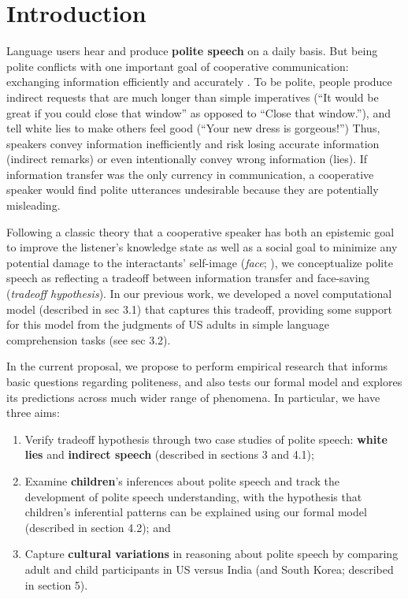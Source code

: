 \section{Introduction}\label{sec:intro}

Language users hear and produce {\bf polite speech} on a daily basis. But being polite conflicts with one important goal of cooperative communication: exchanging information efficiently and accurately \citep{Grice1975}. To be polite, people produce indirect requests that are much longer than simple imperatives (``It would be great if you could close that window'' as opposed to ``Close that window.''), and tell white lies to make others feel good (``Your new dress is gorgeous!'') Thus, speakers convey information inefficiently and risk losing accurate information (indirect remarks) or even intentionally convey wrong information (lies). If information transfer was the only currency in communication, a cooperative speaker would find polite utterances undesirable because they are potentially misleading. 

Following a classic theory that a cooperative speaker has both an epistemic goal to improve the listener's knowledge state as well as a social goal to minimize any potential damage to the interactants' self-image (\emph{face}; \citealt{Brown1987}), we conceptualize polite speech as reflecting a tradeoff between information transfer and face-saving (\emph{tradeoff hypothesis}). In our previous work, we developed a novel computational model (described in sec 3.1) that captures this tradeoff, providing some support for this model from the judgments of US adults in simple language comprehension tasks (see sec 3.2).

In the current proposal, we propose to perform empirical research that informs basic questions regarding politeness, and also tests our formal model and explores its predictions across much wider range of phenomena. In particular, we have three aims:

\begin{enumerate}

\item Verify tradeoff hypothesis through two case studies of polite speech: {\bf white lies} and {\bf indirect speech} (described in sections 3 and 4.1);

\item Examine {\bf children}'s inferences about polite speech and track the development of polite speech understanding, with the hypothesis that children's inferential patterns can be explained using our formal model (described in section 4.2); and

\item Capture {\bf cultural variations} in reasoning about polite speech by comparing adult and child participants in US versus India (and South Korea; described in section 5).

\end{enumerate}

